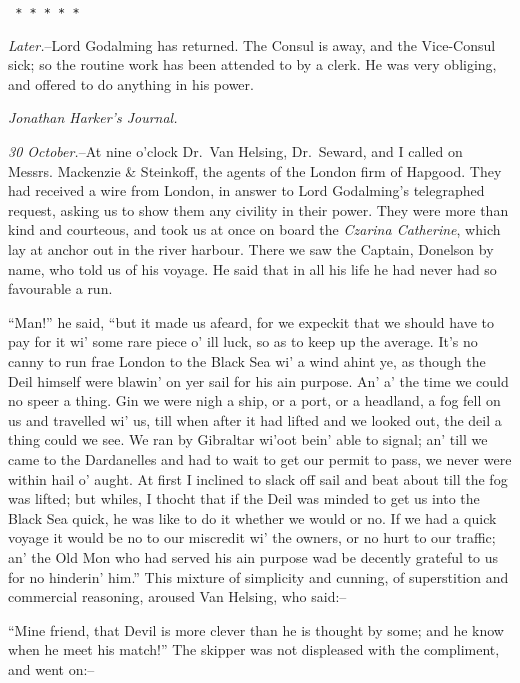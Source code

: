 \documentclass[12pt,openright]{book}
\begin{document}
\texttt{   *       *       *       *       *}

\textit{Later.}–Lord Godalming has returned. The Consul is away, and the Vice-Consul sick; so the routine work has been attended to by a clerk. He was very obliging, and offered to do anything in his power.

\textit{Jonathan Harker’s Journal.}

\textit{30 October.}–At nine o’clock Dr. Van Helsing, Dr. Seward, and I called on Messrs. Mackenzie \& Steinkoff, the agents of the London firm of Hapgood. They had received a wire from London, in answer to Lord Godalming’s telegraphed request, asking us to show them any civility in their power. They were more than kind and courteous, and took us at once on board the \textit{Czarina Catherine}, which lay at anchor out in the river harbour. There we saw the Captain, Donelson by name, who told us of his voyage. He said that in all his life he had never had so favourable a run.

“Man!” he said, “but it made us afeard, for we expeckit that we should have to pay for it wi’ some rare piece o’ ill luck, so as to keep up the average. It’s no canny to run frae London to the Black Sea wi’ a wind ahint ye, as though the Deil himself were blawin’ on yer sail for his ain purpose. An’ a’ the time we could no speer a thing. Gin we were nigh a ship, or a port, or a headland, a fog fell on us and travelled wi’ us, till when after it had lifted and we looked out, the deil a thing could we see. We ran by Gibraltar wi’oot bein’ able to signal; an’ till we came to the Dardanelles and had to wait to get our permit to pass, we never were within hail o’ aught. At first I inclined to slack off sail and beat about till the fog was lifted; but whiles, I thocht that if the Deil was minded to get us into the Black Sea quick, he was like to do it whether we would or no. If we had a quick voyage it would be no to our miscredit wi’ the owners, or no hurt to our traffic; an’ the Old Mon who had served his ain purpose wad be decently grateful to us for no hinderin’ him.” This mixture of simplicity and cunning, of superstition and commercial reasoning, aroused Van Helsing, who said:–

“Mine friend, that Devil is more clever than he is thought by some; and he know when he meet his match!” The skipper was not displeased with the compliment, and went on:–
\end{document}
